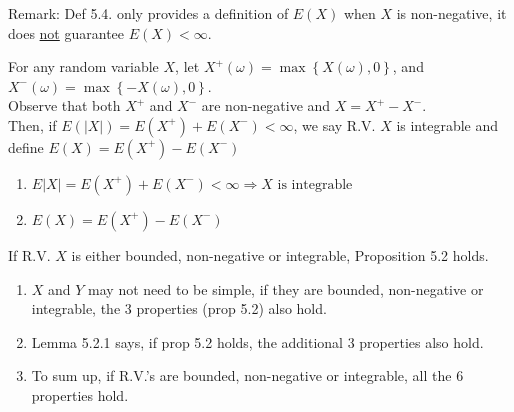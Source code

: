 Remark: Def 5.4. only provides a definition of $E(X)$ when $X$ is non-negative, it does \underline{not} guarantee $E(X) < \infty$.

\begin{definition}
    For any random variable $X$, let $X^+(\omega) = \max\left\{X(\omega), 0\right\}$, and $X^-(\omega) = \max\left\{-X(\omega), 0\right\}$.
    \\Observe that both $X^+$ and $X^-$ are non-negative and $X=X^+ - X^-$.
    \\Then, if $E(|X|) = E(X^+) + E(X^-) < \infty$, we say R.V. $X$ is integrable and define $E(X) = E(X^+) - E(X^-)$
\end{definition}

\begin{center}
\end{center}

\begin{enumerate}
    \item $E|X| = E(X^+)+E(X^-) < \infty \Rightarrow X \text{ is integrable}$
    \item $E(X) = E(X^+) - E(X^-)$
\end{enumerate}

\begin{proposition}
    If R.V. $X$ is either bounded, non-negative or integrable, Proposition 5.2 holds.
\end{proposition}
\begin{enumerate}
    \item $X$ and $Y$ may not need to be simple, if they are bounded, non-negative or integrable, the 3 properties (prop 5.2) also hold.
    \item Lemma 5.2.1 says, if prop 5.2 holds, the additional 3 properties also hold.
    \item To sum up, if R.V.'s are bounded, non-negative or integrable, all the 6 properties hold.
\end{enumerate}

